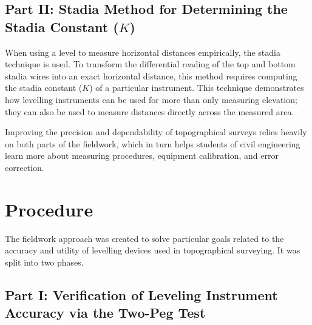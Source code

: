 \documentclass[12pt]{report}
\begin{document}
\subsection*{Part II: Stadia Method for Determining the Stadia Constant (\(K\))}
When using a level to measure horizontal distances empirically, the stadia technique is used. To transform the differential reading of the top and bottom stadia wires into an exact horizontal distance, this method requires computing the stadia constant (\(K\)) of a particular instrument. This technique demonstrates how levelling instruments can be used for more than only measuring elevation; they can also be used to measure distances directly across the measured area.

Improving the precision and dependability of topographical surveys relies heavily on both parts of the fieldwork, which in turn helps students of civil engineering learn more about measuring procedures, equipment calibration, and error correction.

\section*{Procedure}

The fieldwork approach was created to solve particular goals related to the accuracy and utility of levelling devices used in topographical surveying. It was split into two phases.

\subsection*{Part I: Verification of Leveling Instrument Accuracy via the Two-Peg Test}
\end{document}
